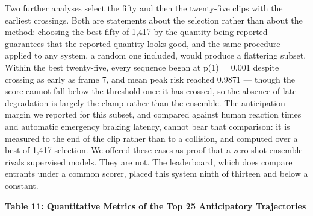 Two further analyses select the fifty and then the twenty-five clips with the earliest crossings. Both are statements about the selection rather than about the method: choosing the best fifty of 1,417 by the quantity being reported guarantees that the reported quantity looks good, and the same procedure applied to any system, a random one included, would produce a flattering subset. Within the best twenty-five, every sequence began at p(1) = 0.001 despite crossing as early as frame 7, and mean peak risk reached 0.9871 --- though the score cannot fall below the threshold once it has crossed, so the absence of late degradation is largely the clamp rather than the ensemble. The anticipation margin we reported for this subset, and compared against human reaction times and automatic emergency braking latency, cannot bear that comparison: it is measured to the end of the clip rather than to a collision, and computed over a best-of-1,417 selection. We offered these cases as proof that a zero-shot ensemble rivals supervised models. They are not. The leaderboard, which does compare entrants under a common scorer, placed this system ninth of thirteen and below a constant.

\textbf{Table 11: Quantitative Metrics of the Top 25 Anticipatory Trajectories}

